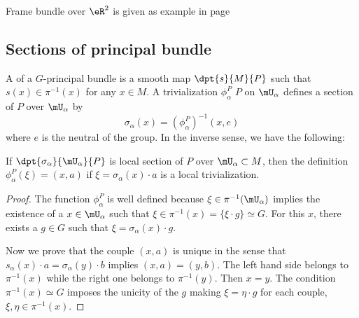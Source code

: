 Frame bundle over $\eR^2$ is given as example in page \pageref{Pg_exempleRdeux}
% 
% 
% 
% 
% 
% 
% 

\subsection{Sections of principal bundle}

A  of a $G$-principal bundle is a smooth map $\dpt{s}{M}{P}$ such that $s(x)\in\pi^{-1}(x)$ for any $x\in M$. A trivialization $\phi_{\alpha}^P$ $P$ on $\mU_{\alpha}$ defines a section of $P$ over $\mU_{\alpha}$ by
\[
   \sigma_{\alpha}(x)=(\phi_{\alpha}^P)^{-1}(x,e)
\]
where $e$ is the neutral of the group. In the inverse sense, we have the following:

\begin{proposition}
If $\dpt{\sigma_{\alpha}}{\mU_{\alpha}}{P}$ is local section of $P$ over $\mU_{\alpha}\subset M$, then the definition $\phi_{\alpha}^P(\xi)=(x,a)$ if $\xi=\sigma_{\alpha}(x)\cdot a$ is a local trivialization.
\end{proposition}

\begin{proof}
The function $\phi_{\alpha}^P$ is well defined because $\xi\in\pi^{-1}(\mU_{\alpha})$ implies the existence of a $x\in\mU_{\alpha}$ such that $\xi\in\pi^{-1}(x)=\{\xi\cdot g\}\simeq G$. For this $x$, there exists a $g\in G$ such that $\xi=\sigma_{\alpha}(x)\cdot g$. 

Now we prove that the couple $(x,a)$ is unique in the sense that $s_{\alpha}(x)\cdot a=\sigma_{\alpha}(y)\cdot b$ implies $(x,a)=(y,b)$. The left hand side belongs to $\pi^{-1}(x)$ while the right one belongs to $\pi^{-1}(y)$. Then $x=y$. The condition $\pi^{-1}(x)\simeq G$ imposes the unicity of the $g$ making $\xi=\eta\cdot g$ for each couple, $\xi,\eta\in\pi^{-1}(x)$.
\end{proof}

